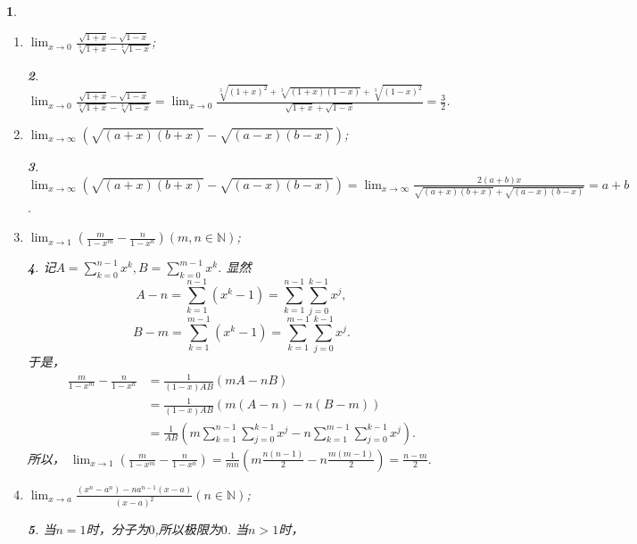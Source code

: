 \documentclass[utf8]{book}
\newtheorem{example}{}[section]             %
\newtheorem{solution}{}
\begin{document}
\begin{example}
\begin{enumerate}
\begin{solution}
\begin{equation*}
\begin{split}
\end{split}
\end{equation*}
\end{solution}
\item $\displaystyle\lim_{x\to 0}\frac{\sqrt{1+x}-\sqrt{1-x}}{\sqrt[3]{1+x}-\sqrt[3]{1-x}}$;
\begin{solution}
$\displaystyle\lim_{x\to 0}\frac{\sqrt{1+x}-\sqrt{1-x}}{\sqrt[3]{1+x}-\sqrt[3]{1-x}}=\displaystyle\lim_{x\to 0}\frac{\sqrt[3]{(1+x)^2}+\sqrt[3]{(1+x)(1-x)}+\sqrt[3]{(1-x)^2}}{\sqrt{1+x}+\sqrt{1-x}}=\frac{3}{2}$.
\end{solution}
\item $\displaystyle\lim_{x\to \infty}(\sqrt{(a+x)(b+x)}-\sqrt{(a-x)(b-x)})$;
\begin{solution}
$\displaystyle\lim_{x\to \infty}(\sqrt{(a+x)(b+x)}-\sqrt{(a-x)(b-x)})=\displaystyle\lim_{x\to \infty}\frac{2(a+b)x}{\sqrt{(a+x)(b+x)}+\sqrt{(a-x)(b-x)}}=a+b$.
\end{solution}
\item $\displaystyle\lim_{x\to 1}\left(\frac{m}{1-x^m}-\frac{n}{1-x^n}\right)(m,n\in\mathbb{N})$;
\begin{solution}
记$A=\displaystyle\sum_{k=0}^{n-1}x^k, B=\displaystyle\sum_{k=0}^{m-1}x^k$.
显然
$$A-n=\displaystyle\sum_{k=1}^{n-1}(x^k-1)=\displaystyle\sum_{k=1}^{n-1}\displaystyle\sum_{j=0}^{k-1}x^j,$$
$$B-m=\displaystyle\sum_{k=1}^{m-1}(x^k-1)=\displaystyle\sum_{k=1}^{m-1}\displaystyle\sum_{j=0}^{k-1}x^j.$$
于是，
\begin{equation*}
\begin{split}
\frac{m}{1-x^m}-\frac{n}{1-x^n}&=\frac{1}{(1-x)AB}(mA-nB)\\
&=\frac{1}{(1-x)AB}(m(A-n)-n(B-m))\\
&=\frac{1}{AB}\left(m\displaystyle\sum_{k=1}^{n-1}\displaystyle\sum_{j=0}^{k-1}x^j-n\displaystyle\sum_{k=1}^{m-1}\displaystyle\sum_{j=0}^{k-1}x^j\right).
\end{split}
\end{equation*}
所以，
$\displaystyle\lim_{x\to 1}\left(\frac{m}{1-x^m}-\frac{n}{1-x^n}\right)=\frac{1}{mn}\left(m\frac{n(n-1)}{2}-n\frac{m(m-1)}{2}\right)=\frac{n-m}{2}.$
\end{solution}
\item $\displaystyle\lim_{x\to a}\frac{(x^n-a^n)-na^{n-1}(x-a)}{(x-a)^2}(n\in\mathbb{N})$;
\begin{solution}
当$n=1$时，分子为$0$,所以极限为$0$. 当$n>1$时，
\begin{equation*}
\begin{split}

\end{split}
\end{equation*}
\end{solution}
\end{enumerate}
\end{example}
\end{document}
